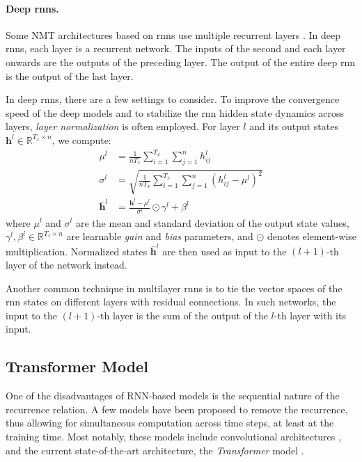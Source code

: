 \paragraph{Deep \acp{rnn}.} Some NMT architectures based on \acp{rnn} use
multiple recurrent layers \citep{miceli-barone-etal-2017-deep,wu2016google}. In
deep \acp{rnn}, each layer is a recurrent network. The inputs of the second and
each layer onwards are the outputs of the preceding layer. The output of the
entire deep \ac{rnn} is the output of the last layer.

In deep \acp{rnn}, there are a few settings to consider. To improve the
convergence speed of the deep models and to stabilize the \ac{rnn} hidden state
dynamics across layers, \emph{layer normalization} \citep{ba2016layer} is often
employed. For layer $l$ and its output states
$\mathbf{h}^l \in \mathbb{R}^{T_x \times n}$, we compute:
%
\begin{align}
  \mu^l &= \frac{1}{nT_x} \sum_{i=1}^{T_x}\sum_{j=1}^n h^l_{ij} \\
  \sigma^l &= \sqrt{\frac{1}{nT_x} \sum_{i=1}^{T_x}\sum_{j=1}^n (h^l_{ij} - \mu^l)^2} \\
  \bar{\mathbf{h}}^l &= \frac{\mathbf{h}^l - \mu^l}{\sigma^l} \odot \gamma^l + \beta^l
\end{align}
%
where $\mu^l$ and $\sigma^l$ are the mean and standard deviation of the output
state values, $\gamma^l, \beta^l \in \mathbb{R}^{T_x \times n}$ are learnable
\emph{gain} and \emph{bias} parameters, and $\odot$ denotes element-wise
multiplication. Normalized states $\bar{\mathbf{h}}^l$ are then used as input
to the $(l+1)$-th layer of the network instead.

Another common technique in multilayer \acp{rnn} is to tie the vector spaces of
the \ac{rnn} states on different layers with residual connections. In such
networks, the input to the $(l+1)$-th layer is the sum of the output of the
$l$-th layer with its input.


\subsection{Transformer Model}
\label{sec:encdec:transformer}

One of the disadvantages of RNN-based models is the sequential nature of the
recurrence relation. A few models have been proposed to remove the recurrence,
thus allowing for simultaneous computation across time steps, at least at the
training time. Most notably, these models include convolutional architectures
\citep{gehring2017convolutional}, and the current state-of-the-art
architecture, the \emph{Transformer} model \citep{vaswani2017attention}.

